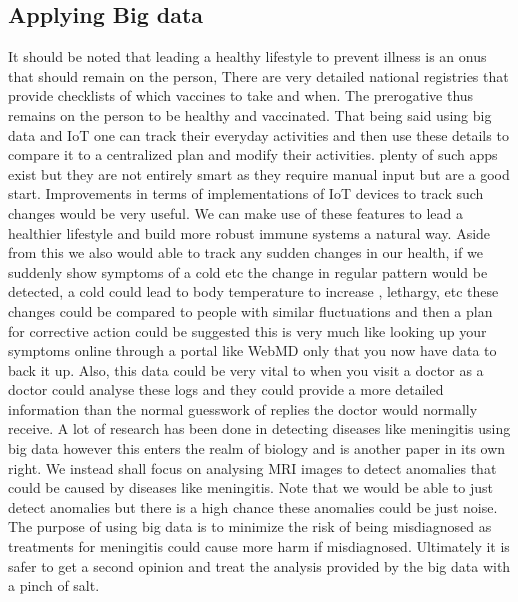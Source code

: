 \documentclass[sigconf]{acmart}
\begin{document}
\subsection{Applying Big data}
It should be noted that leading a healthy lifestyle to prevent illness is an onus that should remain on the person, There are very detailed national registries that provide checklists of which vaccines to take and when. The prerogative thus remains on the person to be healthy and vaccinated. That being said using big data and IoT one can track their everyday activities and then use these details to compare it to a centralized plan and modify their activities. plenty of such apps exist but they are not entirely smart as they require manual input but are a good start. Improvements in terms of implementations of IoT devices to track such changes would be very useful. We can make use of these features to lead a healthier lifestyle and build more robust immune systems a natural way. Aside from this we also would able to track any sudden changes in our health, if we suddenly show symptoms of a cold etc the change in regular pattern would be detected, a cold could lead to body temperature to increase , lethargy, etc these changes could be compared to people with similar fluctuations and then a plan for corrective action could be suggested this is very much like looking up your symptoms online through a portal like WebMD only that you now have data to back it up. Also, this data could be very vital to when you visit a doctor as a doctor could analyse these logs and they could provide a more detailed information than the normal guesswork of replies the doctor would normally receive. A lot of research has been done in detecting diseases like meningitis using big data however this enters the realm of biology and is another paper in its own right. We instead shall focus on analysing MRI images to detect anomalies that could be caused by diseases like meningitis. Note that we would be able to just detect anomalies but there is a high chance these anomalies could be just noise. The purpose of using big data is to minimize the risk of being misdiagnosed as treatments for meningitis could cause more harm if misdiagnosed. Ultimately it is safer to get a second opinion and treat the analysis provided by the big data with a pinch of salt.
\newline
\end{document}
